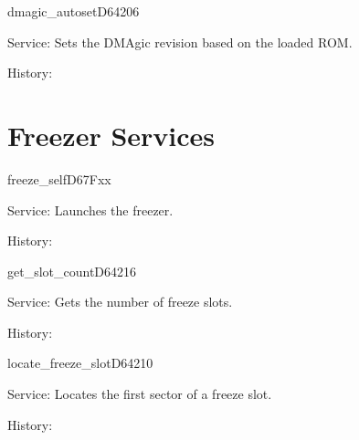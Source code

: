 \begin{hyppotrap}{dmagic\_autoset}{D642}{06}
\item [Service:]
  Sets the DMAgic revision based on the loaded ROM.
\item [History:]
\end{hyppotrap}



\newpage
\section{Freezer Services}


\begin{hyppotrap}{freeze\_self}{D67F}{xx}
\item [Service:]
  Launches the freezer.
\item [History:]
\end{hyppotrap}


\begin{hyppotrap}{get\_slot\_count}{D642}{16}
\item [Service:]
  Gets the number of freeze slots.
\item [History:]
\end{hyppotrap}


\begin{hyppotrap}{locate\_freeze\_slot}{D642}{10}
\item [Service:]
  Locates the first sector of a freeze slot.
\item [History:]
\end{hyppotrap}


